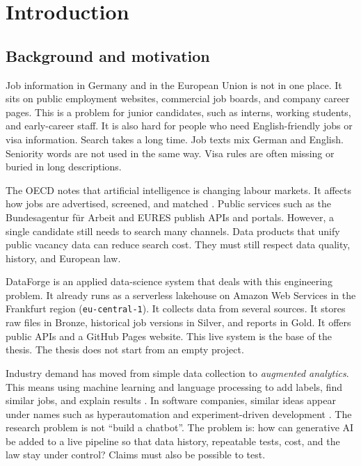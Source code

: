 \chapter{Introduction}
\label{ch:introduction}

\section{Background and motivation}
\label{sec:motivation}

Job information in Germany and in the European Union is not in one place. It sits on public employment websites, commercial job boards, and company career pages. This is a problem for junior candidates, such as interns, working students, and early-career staff. It is also hard for people who need English-friendly jobs or visa information. Search takes a long time. Job texts mix German and English. Seniority words are not used in the same way. Visa rules are often missing or buried in long descriptions.

The OECD notes that artificial intelligence is changing labour markets. It affects how jobs are advertised, screened, and matched . Public services such as the Bundesagentur f\"ur Arbeit and EURES publish APIs and portals. However, a single candidate still needs to search many channels. Data products that unify public vacancy data can reduce search cost. They must still respect data quality, history, and European law.

DataForge is an applied data-science system that deals with this engineering problem. It already runs as a serverless lakehouse on Amazon Web Services in the Frankfurt region (\texttt{eu-central-1}). It collects data from several sources. It stores raw files in Bronze, historical job versions in Silver, and reports in Gold. It offers public APIs and a GitHub Pages website. This live system is the base of the thesis. The thesis does not start from an empty project.

Industry demand has moved from simple data collection to \emph{augmented analytics}. This means using machine learning and language processing to add labels, find similar jobs, and explain results . In software companies, similar ideas appear under names such as hyperautomation and experiment-driven development . The research problem is not ``build a chatbot''. The problem is: how can generative AI be added to a live pipeline so that data history, repeatable tests, cost, and the law stay under control? Claims must also be possible to test.

